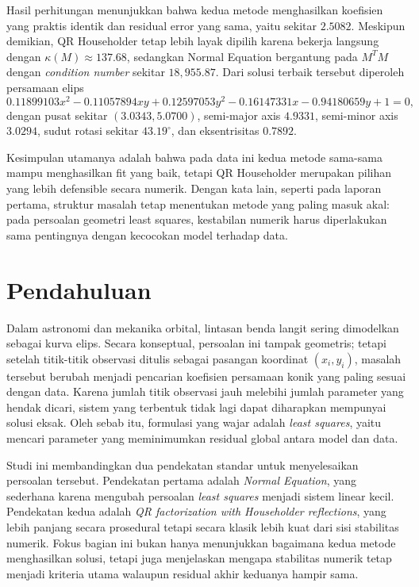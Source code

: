 \documentclass[12pt,a4paper]{article}
\begin{document}
Hasil perhitungan menunjukkan bahwa kedua metode menghasilkan koefisien yang praktis identik dan residual error yang sama, yaitu sekitar $2.5082$. Meskipun demikian, QR Householder tetap lebih layak dipilih karena bekerja langsung dengan \(\kappa(M)\approx 137.68\), sedangkan Normal Equation bergantung pada \(M^TM\) dengan \emph{condition number} sekitar $18{,}955.87$. Dari solusi terbaik tersebut diperoleh persamaan elips
\[
0.11899103x^2 - 0.11057894xy + 0.12597053y^2 - 0.16147331x - 0.94180659y + 1 = 0,
\]
dengan pusat sekitar $(3.0343, 5.0700)$, semi-major axis $4.9331$, semi-minor axis $3.0294$, sudut rotasi sekitar $43.19^\circ$, dan eksentrisitas $0.7892$.

Kesimpulan utamanya adalah bahwa pada data ini kedua metode sama-sama mampu menghasilkan fit yang baik, tetapi QR Householder merupakan pilihan yang lebih defensible secara numerik. Dengan kata lain, seperti pada laporan pertama, struktur masalah tetap menentukan metode yang paling masuk akal: pada persoalan geometri least squares, kestabilan numerik harus diperlakukan sama pentingnya dengan kecocokan model terhadap data.

\section{Pendahuluan}
Dalam astronomi dan mekanika orbital, lintasan benda langit sering dimodelkan sebagai kurva elips. Secara konseptual, persoalan ini tampak geometris; tetapi setelah titik-titik observasi ditulis sebagai pasangan koordinat \((x_i,y_i)\), masalah tersebut berubah menjadi pencarian koefisien persamaan konik yang paling sesuai dengan data. Karena jumlah titik observasi jauh melebihi jumlah parameter yang hendak dicari, sistem yang terbentuk tidak lagi dapat diharapkan mempunyai solusi eksak. Oleh sebab itu, formulasi yang wajar adalah \emph{least squares}, yaitu mencari parameter yang meminimumkan residual global antara model dan data.

Studi ini membandingkan dua pendekatan standar untuk menyelesaikan persoalan tersebut. Pendekatan pertama adalah \emph{Normal Equation}, yang sederhana karena mengubah persoalan \emph{least squares} menjadi sistem linear kecil. Pendekatan kedua adalah \emph{QR factorization with Householder reflections}, yang lebih panjang secara prosedural tetapi secara klasik lebih kuat dari sisi stabilitas numerik. Fokus bagian ini bukan hanya menunjukkan bagaimana kedua metode menghasilkan solusi, tetapi juga menjelaskan mengapa stabilitas numerik tetap menjadi kriteria utama walaupun residual akhir keduanya hampir sama.
\end{document}
